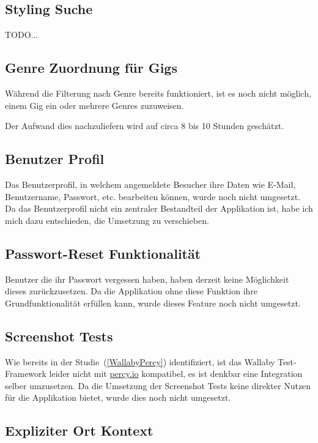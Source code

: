 \subsection{Styling Suche}

TODO...

\subsection{Genre Zuordnung für Gigs}

Während die Filterung nach Genre bereits funktioniert, ist es noch nicht
möglich, einem Gig ein oder mehrere Genres zuzuweisen.

Der Aufwand dies nachzuliefern wird auf circa 8 bis 10 Stunden geschätzt.

\subsection{Benutzer Profil}

Das Benutzerprofil, in welchem angemeldete Besucher ihre Daten wie E-Mail,
Benutzername, Passwort, etc. bearbeiten können, wurde noch nicht umgesetzt.
Da das Benutzerprofil nicht ein zentraler Bestandteil der Applikation ist,
habe ich mich dazu entschieden, die Umsetzung zu verschieben.

\subsection{Passwort-Reset Funktionalität}

Benutzer die ihr Passwort vergessen haben, haben derzeit keine Möglichkeit
dieses zurückzusetzen. Da die Applikation ohne diese Funktion ihre
Grundfunktionalität erfüllen kann, wurde dieses Feature noch nicht umgesetzt.

\subsection{Screenshot Tests}

Wie bereits in der Studie~(\ref{WallabyPercy}) identifiziert, ist das
Wallaby Test-Framework leider nicht mit \href{https://percy.io/}{percy.io}
kompatibel, es ist denkbar eine Integration selber umzusetzen. Da die
Umsetzung der Screenshot Tests keine direkter Nutzen für die Applikation
bietet, wurde dies noch nicht umgesetzt.

\subsection{Expliziter Ort Kontext}

